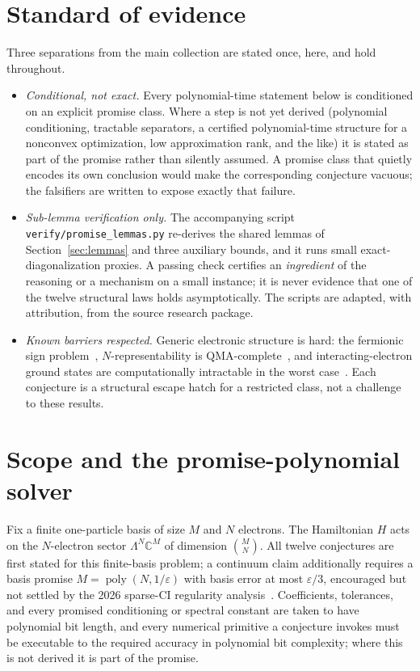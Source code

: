 \documentclass[11pt]{article}
\theoremstyle{definition}
\newcommand{\eps}{\varepsilon}
\newcommand{\poly}{\operatorname{poly}}
\begin{document}
\section*{Standard of evidence}
Three separations from the main collection are stated once, here, and hold
throughout.
\begin{itemize}
\item \emph{Conditional, not exact.}  Every polynomial-time statement below is
conditioned on an explicit promise class.  Where a step is not yet derived
(polynomial conditioning, tractable separators, a certified polynomial-time
structure for a nonconvex optimization, low approximation rank, and the like) it
is stated as part of the promise rather than silently assumed.  A promise class
that quietly encodes its own conclusion would make the corresponding conjecture
vacuous; the falsifiers are written to expose exactly that failure.
\item \emph{Sub-lemma verification only.}  The accompanying script
\texttt{verify/promise\_lemmas.py} re-derives the shared lemmas of
Section~\ref{sec:lemmas} and three auxiliary bounds, and it runs small
exact-diagonalization proxies.  A passing check certifies an \emph{ingredient}
of the reasoning or a mechanism on a small instance; it is never evidence that
one of the twelve structural laws holds asymptotically.  The scripts are adapted,
with attribution, from the source research package.
\item \emph{Known barriers respected.}  Generic electronic structure is hard: the
fermionic sign problem~\cite{R1}, $N$-representability is
$\mathrm{QMA}$-complete~\cite{R2}, and interacting-electron ground states are
computationally intractable in the worst case~\cite{R3}.  Each conjecture is a
structural escape hatch for a restricted class, not a challenge to these results.
\end{itemize}

\section{Scope and the promise-polynomial solver}
Fix a finite one-particle basis of size $M$ and $N$ electrons.  The Hamiltonian
$H$ acts on the $N$-electron sector $\Lambda^N\mathbb C^M$ of dimension
$\binom MN$.  All twelve conjectures are first stated for this finite-basis
problem; a continuum claim additionally requires a basis promise
$M=\poly(N,1/\eps)$ with basis error at most $\eps/3$, encouraged but not settled
by the 2026 sparse-CI regularity analysis~\cite{R4}.  Coefficients, tolerances,
and every promised conditioning or spectral constant are taken to have
polynomial bit length, and every numerical primitive a conjecture invokes must be
executable to the required accuracy in polynomial bit complexity; where this is
not derived it is part of the promise.
\end{document}
